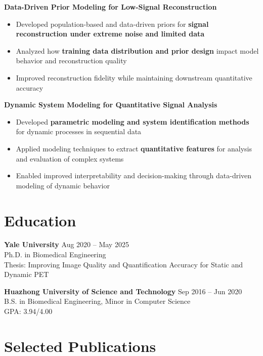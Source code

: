 \textbf{Data-Driven Prior Modeling for Low-Signal Reconstruction}
\begin{itemize}[leftmargin=*]
\item Developed population-based and data-driven priors for \textbf{signal reconstruction under extreme noise and limited data}
\item Analyzed how \textbf{training data distribution and prior design} impact model behavior and reconstruction quality
\item Improved reconstruction fidelity while maintaining downstream quantitative accuracy
\end{itemize}

\textbf{Dynamic System Modeling for Quantitative Signal Analysis}
\begin{itemize}[leftmargin=*]
\item Developed \textbf{parametric modeling and system identification methods} for dynamic processes in sequential data
\item Applied modeling techniques to extract \textbf{quantitative features} for analysis and evaluation of complex systems
\item Enabled improved interpretability and decision-making through data-driven modeling of dynamic behavior
\end{itemize}

\section{Education}
\textbf{Yale University} \hfill Aug 2020 -- May 2025 \\
Ph.D. in Biomedical Engineering \\
Thesis: Improving Image Quality and Quantification Accuracy for Static and Dynamic PET

\textbf{Huazhong University of Science and Technology} \hfill Sep 2016 -- Jun 2020 \\
B.S. in Biomedical Engineering, Minor in Computer Science \\
GPA: 3.94/4.00

\section{Selected Publications}

